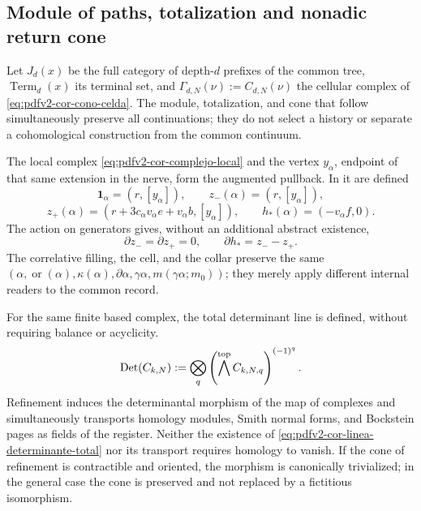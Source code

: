 \subsection{Module of paths, totalization and nonadic return cone}
Let \(J_d(x)\) be the full category of depth-\(d\) prefixes of the
common tree, \(\operatorname{Term}_d(x)\) its terminal set, and
\(\Gamma_{d,N}(\nu):=C_{d,N}(\nu)\) the cellular complex of
\eqref{eq:pdfv2-cor-cono-celda}. The module, totalization, and cone that
follow simultaneously preserve all continuations; they do not select
a history or separate a cohomological construction from the common continuum.
\begingroup
  \let\section\subsection
  
\endgroup

The local complex \eqref{eq:pdfv2-cor-complejo-local} and the vertex
\(y_\alpha\), endpoint of that same extension in the nerve, form the augmented
pullback. In it are defined
\begin{equation}
\label{eq:pdfv2-cor-zpm-h}
 \mathbf1_\alpha=(r,[y_\alpha]),\qquad
 z_-(\alpha)=(r,[y_\alpha]),
\end{equation}
\begin{equation}
\label{eq:pdfv2-cor-zplus-h}
 z_+(\alpha)=
 (r+3c_\alpha v_\alpha e+v_\alpha b,[y_\alpha]),
 \qquad
 h_*(\alpha)=(-v_\alpha f,0).
\end{equation}
The action on generators gives, without an additional abstract existence,
\begin{equation}
\label{eq:pdfv2-cor-filler}
 \partial z_-=\partial z_+=0,\qquad
 \partial h_*=z_--z_+.
\end{equation}
The correlative filling, the cell, and the collar preserve the same
\((\alpha,\operatorname{or}(\alpha),\kappa(\alpha),\partial\alpha,
\gamma\alpha,m(\gamma\alpha;m_0))\); they merely apply different internal readers
to the common record.

For the same finite based complex, the total determinant line is defined, without requiring balance or acyclicity.
\begin{equation}
\label{eq:pdfv2-cor-linea-determinante-total}
 \operatorname{Det}(C_{k,N}):=
 \bigotimes_q
 \left(\bigwedge^{\rm top}C_{k,N,q}\right)^{(-1)^q}.
\end{equation}
Refinement induces the determinantal morphism of the map of complexes and
simultaneously transports homology modules, Smith normal forms, and
Bockstein pages as fields of the register. Neither the existence of
\eqref{eq:pdfv2-cor-linea-determinante-total} nor its transport requires
homology to vanish. If the cone of refinement is contractible and oriented,
the morphism is canonically trivialized; in the general case the
cone is preserved and not replaced by a fictitious isomorphism.

